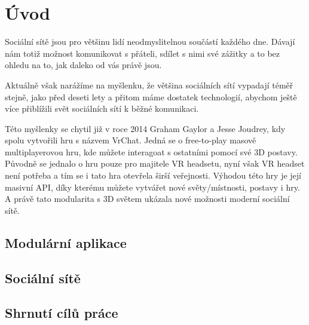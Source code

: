 \chapter{Úvod}

Sociální sítě jsou pro většinu lidí neodmyslitelnou součástí každého dne.
Dávají nám totiž možnost komunikovat s přáteli, sdílet s nimi své zážitky
a to bez ohledu na to, jak daleko od vás právě jsou.

Aktuálně však narážíme na myšlenku, že většina sociálních sítí vypadají téměř stejně,
jako před deseti lety a přitom máme dostatek technologií, abychom ještě více přiblížili svět
sociálních sítí k běžné komunikaci.

Této myšlenky se chytil již v roce 2014 Graham Gaylor a Jesse Joudrey, kdy spolu vytvořili
hru s názvem VrChat. Jedná se o free-to-play masově multiplayerovou hru, kde můžete interagoat
s ostatními pomocí své 3D postavy. Původně se jednalo o hru pouze pro majitele VR headsetu, nyní
však VR headset není potřeba a tím se i tato hra otevřela širší veřejnosti. Výhodou této hry
je její masivní API, díky kterému můžete vytvářet nové světy/místnosti, postavy i hry.
A právě tato modularita s 3D světem ukázala nové možnosti moderní sociální sítě.

\section{Modulární aplikace}

\section{Sociální sítě}

\section{Shrnutí cílů práce}